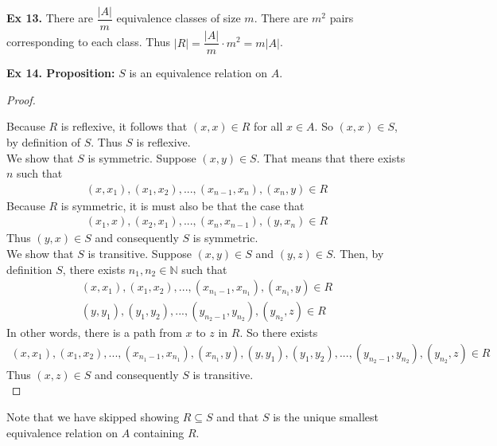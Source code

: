 \documentclass{article}
\begin{document}
\noindent \textbf{Ex 13.} There are $\dfrac{|A|}{m}$ equivalence classes of size $m$. There are $m^2$ pairs corresponding to each class. Thus $|R|=\dfrac{|A|}{m} \cdot{} m^2=m|A|$.\\

\newpage

\noindent \textbf{Ex 14. Proposition:} $S$ is an equivalence relation on $A$.

\begin{proof}
$ $\newline

\noindent Because $R$ is reflexive, it follows that $(x,x) \in R$ for all $x \in A$. So $(x,x) \in S$, by definition of $S$. Thus $S$ is reflexive.\\

\noindent We show that $S$ is symmetric. Suppose $(x, y) \in S$. That means that there exists $n$ such that
\begin{align*}
(x,x_1), (x_1, x_2), ..., (x_{n-1}, x_{n}), (x_{n}, y) \in R
\end{align*}
Because $R$ is symmetric, it is must also be that the case that
\begin{align*}
(x_1,x), (x_2, x_1), ..., (x_n, x_{n-1}), (y, x_{n}) \in R
\end{align*}
Thus $(y, x) \in S$ and consequently $S$ is symmetric.\\

\noindent We show that $S$ is transitive. Suppose $(x, y) \in S$ and $(y, z) \in S$. Then, by definition $S$, there exists $n_1, n_2 \in \mathbb{N}$ such that
\begin{align*}
(x,x_1), (x_1, x_2), ..., (x_{n_1-1}, x_{n_1}), (x_{n_1}, y) \in R\\
(y,y_1), (y_1, y_2), ..., (y_{n_2-1}, y_{n_2}), (y_{n_2}, z) \in R
\end{align*}
In other words, there is a path from $x$ to $z$ in $R$. So there exists
\begin{align*}
(x,x_1), (x_1, x_2), ..., (x_{n_1-1}, x_{n_1}), (x_{n_1}, y), (y,y_1), (y_1, y_2), ..., (y_{n_2-1}, y_{n_2}), (y_{n_2}, z) \in R
\end{align*}
Thus $(x, z) \in S$ and consequently $S$ is transitive.\\
\end{proof}

\noindent Note that we have skipped showing $R \subseteq S$ and that $S$ is the unique smallest equivalence relation on $A$ containing $R$.\\
\end{document}
